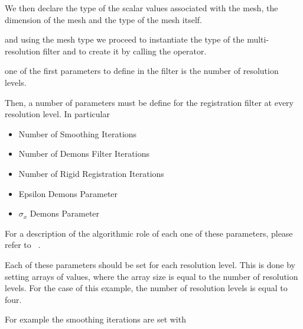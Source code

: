 \documentclass{InsightArticle}
\begin{document}
\begin{center}

\end{center}


We then declare the type of the scalar values associated with the mesh, the
dimension of the mesh and the type of the mesh itself.

\begin{center}

\end{center}

and using the mesh type we proceed to instantiate the type of the
multi-resolution filter and to create it by calling the  operator.

\begin{center}

\end{center}

one of the first parameters to define in the filter is the number of resolution levels.

\begin{center}

\end{center}

Then, a number of parameters must be define for the registration filter at every 
resolution level. In particular

\begin{itemize}
\item Number of Smoothing Iterations
\item Number of Demons Filter Iterations
\item Number of Rigid Registration Iterations
\item Epsilon Demons Parameter
\item $\sigma_x$ Demons Parameter
\end{itemize}

For a description of the algorithmic role of each one of these parameters,
please refer to ~\cite{Yeo2009}.

Each of these parameters should be set for each resolution level. This is done
by setting arrays of values, where the array size is equal to the number of
resolution levels. For the case of this example, the number of resolution
levels is equal to four.

For example the smoothing iterations are set with
\end{document}
